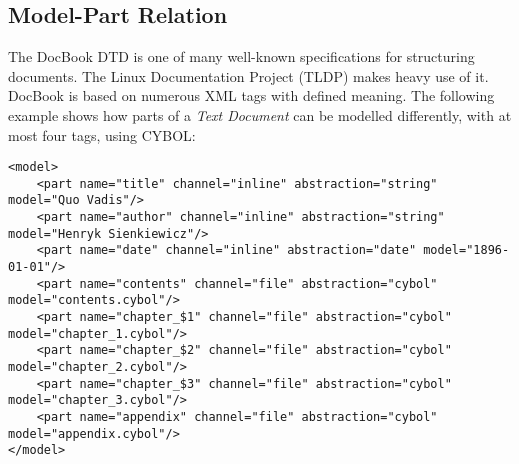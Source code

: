 %
%
%
%
%
%

\subsection{Model-Part Relation}
\label{model_part_relation_heading}

The DocBook DTD \cite{docbook} is one of many well-known specifications for
structuring documents. The Linux Documentation Project (TLDP) \cite{linuxdoc}
makes heavy use of it. DocBook is based on numerous XML tags with defined
meaning. The following example shows how parts of a \emph{Text Document} can be
modelled differently, with at most four tags, using CYBOL:

\begin{scriptsize}
    \begin{verbatim}
<model>
    <part name="title" channel="inline" abstraction="string" model="Quo Vadis"/>
    <part name="author" channel="inline" abstraction="string" model="Henryk Sienkiewicz"/>
    <part name="date" channel="inline" abstraction="date" model="1896-01-01"/>
    <part name="contents" channel="file" abstraction="cybol" model="contents.cybol"/>
    <part name="chapter_$1" channel="file" abstraction="cybol" model="chapter_1.cybol"/>
    <part name="chapter_$2" channel="file" abstraction="cybol" model="chapter_2.cybol"/>
    <part name="chapter_$3" channel="file" abstraction="cybol" model="chapter_3.cybol"/>
    <part name="appendix" channel="file" abstraction="cybol" model="appendix.cybol"/>
</model>
    \end{verbatim}
\end{scriptsize}
